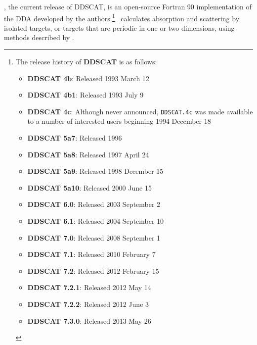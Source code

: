 \ddscatv, the current release of DDSCAT, is an open-source Fortran 90 
implementation of the DDA 
developed by the authors.\footnote{
	The release history of {\bf DDSCAT} is as follows:
	\begin{itemize}
	\vspace*{-0.4em}
	\item{\bf DDSCAT 4b}: Released 1993 March 12
	\vspace*{-0.4em} 
	\item{\bf DDSCAT 4b1}: Released 1993 July 9
	\vspace*{-0.4em} 
	\item{\bf DDSCAT 4c}: Although never announced, {\tt DDSCAT.4c} 
		was made available to a number of interested users
		beginning 1994 December 18
	\vspace*{-0.4em}
	\item{\bf DDSCAT 5a7}: Released 1996
	\vspace*{-0.4em}
	\item{\bf DDSCAT 5a8}: Released 1997 April 24
	\vspace*{-0.4em}
	\item{\bf DDSCAT 5a9}: Released 1998 December 15
	\vspace*{-0.4em}
	\item{\bf DDSCAT 5a10}: Released 2000 June 15
	\vspace*{-0.4em}
	\item{\bf DDSCAT 6.0}: Released 2003 September 2
	\vspace*{-0.4em}
	\item{\bf DDSCAT 6.1}: Released 2004 September 10
	\vspace*{-0.4em}
	\item{\bf DDSCAT 7.0}: Released 2008 September 1
        \vspace*{-0.4em}
        \item{\bf DDSCAT 7.1}: Released 2010 February 7
        \vspace*{-0.4em}
        \item{\bf DDSCAT 7.2}: Released 2012 February 15
        \vspace*{-0.4em}
        \item{\bf DDSCAT 7.2.1}: Released 2012 May 14
        \vspace*{-0.4em}
        \item{\bf DDSCAT 7.2.2}: Released 2012 June 3
        \vspace*{-0.4em}
        \item{\bf DDSCAT 7.3.0}: Released 2013 May 26
	\end{itemize}
	}
\ddscatv\ calculates absorption and scattering by isolated targets, or
targets that are periodic in one or two
dimensions, using methods described by \citet{Draine+Flatau_2008a}.


